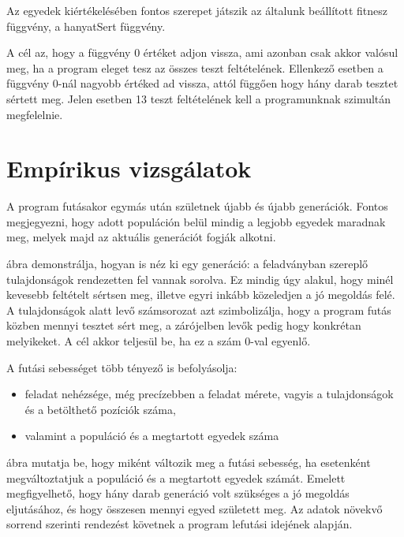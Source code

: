 \documentclass[12pt,a4paper,oneside]{report}
\begin{document}
	Az egyedek kiértékelésében fontos szerepet játszik az általunk beállított fitnesz függvény, a hanyatSert függvény.


	A cél az, hogy a függvény 0 értéket adjon vissza, ami azonban csak akkor valósul meg, ha a program eleget tesz az összes teszt feltételének.
	Ellenkező esetben a függvény 0-nál nagyobb értéked ad vissza, attól függően hogy hány darab tesztet sértett meg.
	Jelen esetben 13 teszt feltételének kell a programunknak szimultán megfelelnie.

	

\chapter{Empírikus vizsgálatok} %
	A program futásakor egymás után születnek újabb és újabb generációk. Fontos megjegyezni, hogy adott populáción belül mindig a legjobb egyedek maradnak meg, melyek majd az aktuális generációt fogják alkotni.


	 ábra demonstrálja, hogyan is néz ki egy generáció: a feladványban szereplő tulajdonságok rendezetten fel vannak sorolva.
	Ez mindig úgy alakul, hogy minél kevesebb feltételt sértsen meg, illetve egyri inkább közeledjen a jó megoldás felé.
	A tulajdonságok alatt levő számsorozat azt szimbolizálja, hogy a program futás közben mennyi tesztet sért meg, a zárójelben levők pedig hogy konkrétan melyikeket.
	A cél akkor teljesül be, ha ez a szám 0-val egyenlő.


	A futási sebességet több tényező is befolyásolja:

	\begin{itemize}
	\item feladat nehézsége, még precízebben a feladat mérete, vagyis a tulajdonságok és a betölthető pozíciók száma,
	\item valamint a populáció és a megtartott egyedek száma
	\end{itemize}

	 ábra mutatja be, hogy miként változik meg a futási sebesség, ha esetenként megváltoztatjuk a populáció és a megtartott egyedek számát.
	Emelett megfigyelhető, hogy hány darab generáció volt szükséges a jó megoldás eljutásához, és hogy összesen mennyi egyed született meg.
	Az adatok növekvő sorrend szerinti rendezést követnek a program lefutási idejének alapján.
\end{document}
